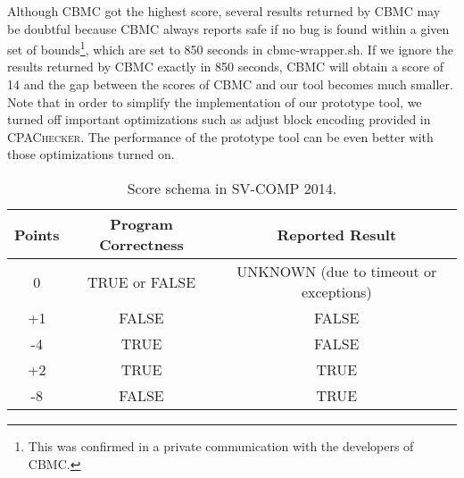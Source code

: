 Although CBMC got the highest score, several results returned by CBMC
may be doubtful because CBMC always reports safe if no bug is found
within a given set of bounds\footnote{This was confirmed in a private
  communication with the developers of CBMC.}, which are set to 850
seconds in cbmc-wrapper.sh.
If we ignore the results returned by CBMC exactly in 850 seconds, CBMC 
will obtain a score of 14 and the gap between the scores of CBMC and
our tool becomes much smaller.
Note that in order to simplify the implementation of our prototype
tool, we turned off important optimizations such as adjust block
encoding provided in \textsc{CPAChecker}.
The performance of the prototype tool can be even better with those
optimizations turned on.

\begin{table}
\caption{Score schema in SV-COMP 2014.\label{table:score-schema}}
\begin{center}
\begin{tabular}{|c|c|c|}
\hline
Points & Program Correctness & Reported Result \\\hline
0      & TRUE or FALSE & UNKNOWN (due to timeout or exceptions) \\
+1     & FALSE         & FALSE \\
-4     & TRUE          & FALSE \\
+2     & TRUE          & TRUE \\
-8     & FALSE         & TRUE \\\hline
\end{tabular}
\end{center}
\end{table}

